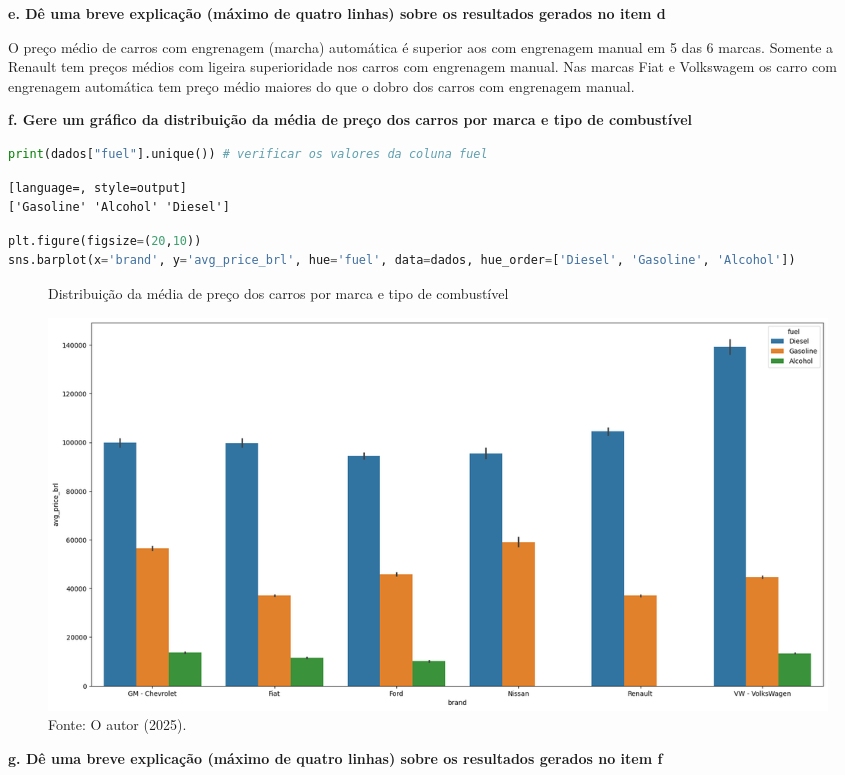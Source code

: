 \begin{adjustwidth}{1em}{}
\textbf{e. Dê uma breve explicação (máximo de quatro linhas) sobre os resultados gerados no item d}
\end{adjustwidth}

O preço médio de carros com engrenagem (marcha) automática é superior aos com engrenagem manual em 5 das 6 marcas. Somente a Renault tem preços médios com ligeira superioridade nos carros com engrenagem manual. Nas marcas Fiat e Volkswagem os carro com engrenagem automática tem preço médio maiores do que o dobro dos carros com engrenagem manual.

\begin{adjustwidth}{1em}{}
\textbf{f. Gere um gráfico da distribuição da média de preço dos carros por marca e tipo de combustível}
\end{adjustwidth}
\begin{lstlisting}[language=Python, style=input]
print(dados["fuel"].unique()) # verificar os valores da coluna fuel
\end{lstlisting}
\begin{lstlisting}[language=, style=output]
['Gasoline' 'Alcohol' 'Diesel']
\end{lstlisting}
\begin{lstlisting}[language=Python, style=input]
plt.figure(figsize=(20,10))
sns.barplot(x='brand', y='avg_price_brl', hue='fuel', data=dados, hue_order=['Diesel', 'Gasoline', 'Alcohol'])
\end{lstlisting}
\begin{figure}[H]
\centering
\caption{Distribuição da média de preço dos carros por marca e tipo de combustível}
\includegraphics[width=1\linewidth]{apendices/fig/2_IAA002_5.png}
\caption*{Fonte: O autor (2025).}
\end{figure}

\begin{adjustwidth}{1em}{}
\textbf{g. Dê uma breve explicação (máximo de quatro linhas) sobre os resultados gerados no item f}
\end{adjustwidth}

